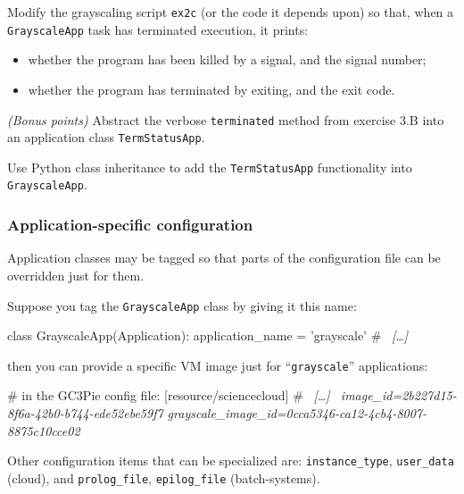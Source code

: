 \documentclass[english,serif,mathserif,xcolor=pdftex,dvipsnames,table]{beamer}
\begin{document}
\begin{frame}
  \begin{exercise*}[6.B]

    Modify the grayscaling script \texttt{ex2c} (or the code it
    depends upon) so that, when a \texttt{GrayscaleApp} task has
    terminated execution, it prints:
    \begin{itemize}
    \item whether the program has been killed by a signal, and the signal number;
    \item whether the program has terminated by exiting, and the exit code.
    \end{itemize}
  \end{exercise*}
\end{frame}


\begin{frame}
  \begin{exercise*}[6.B+] \emph{(Bonus points)} Abstract the verbose
    \texttt{terminated} method from exercise 3.B into an application
    class \texttt{TermStatusApp}.

    \+
    Use Python class inheritance to add the \texttt{TermStatusApp}
    functionality into \texttt{GrayscaleApp}.
  \end{exercise*}
\end{frame}


\begin{frame}[fragile]\small
  \frametitle{Application-specific configuration}

  Application classes may be tagged so that parts of the configuration
  file can be overridden just for them.

  \+
  Suppose you tag the \texttt{GrayscaleApp} class by giving it this name:
\begin{python}
  class GrayscaleApp(Application):
    application_name = 'grayscale'
    # ~\itshape [\ldots]~
\end{python}
  then you can provide a specific VM image just for
  ``\texttt{grayscale}'' applications:
  \begin{stdout}
  # in the GC3Pie config file:
  [resource/sciencecloud]
  # ~\itshape [\ldots]~
  image_id=2b227d15-8f6a-42b0-b744-ede52ebe59f7
  grayscale_image_id=0cca5346-ca12-4cb4-8007-8875c10cce02
  \end{stdout}

  \+ Other configuration items that can be specialized are:
  \lstinline|instance_type|, \lstinline|user_data| (cloud),
  and \lstinline|prolog_file|, \lstinline|epilog_file|
  (batch-systems).
\end{frame}
\end{document}
